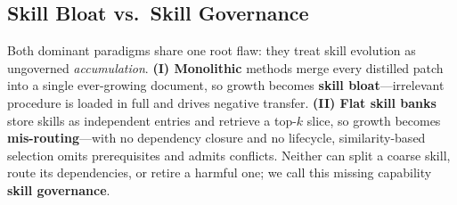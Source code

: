 
\subsection{Skill Bloat vs.\ Skill Governance}
\label{sec:background}
Both dominant paradigms share one root flaw: they treat skill evolution as ungoverned \emph{accumulation}.
\textbf{(I) Monolithic} methods merge every distilled patch into a single ever-growing document, so growth becomes \textbf{skill bloat}---irrelevant procedure is loaded in full and drives negative transfer.
\textbf{(II) Flat skill banks} store skills as independent entries and retrieve a top-$k$ slice, so growth becomes \textbf{mis-routing}---with no dependency closure and no lifecycle, similarity-based selection omits prerequisites and admits conflicts.
Neither can split a coarse skill, route its dependencies, or retire a harmful one; we call this missing capability \textbf{skill governance}.
